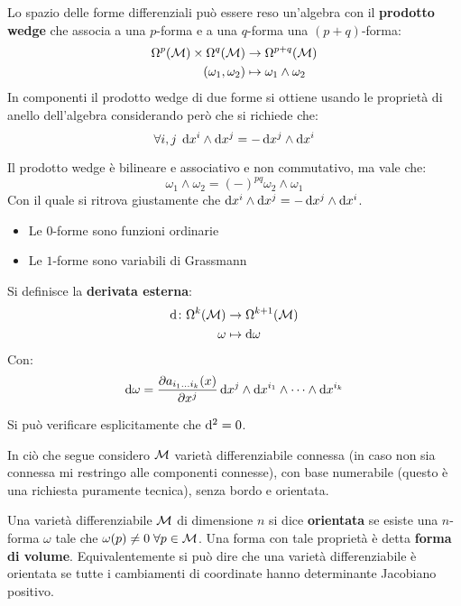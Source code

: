 \begin{definition}
  Lo spazio delle forme differenziali può essere reso un'algebra con il \textbf{prodotto wedge}
  che associa a una $ p $-forma e a una $ q $-forma una $ (p+q) $-forma:
  \begin{align*}
    \Omega^p(\mathcal{M}) \times \Omega^q(\mathcal{M}) & \to \Omega^{p+q}(\mathcal{M}) \\
    (\omega_1, \omega_2) & \mapsto \omega_1 \wedge \omega_2
  \end{align*}
  In componenti il prodotto wedge di due forme si ottiene usando le proprietà di anello dell'algebra
  considerando però che si richiede che:
  \[
    \forall i,j \; \operatorname{d}\!{x}^i \wedge \operatorname{d}\!{x}^j = - \operatorname{d}\!{x}^j \wedge \operatorname{d}\!{x}^i
  \]
\end{definition}
Il prodotto wedge è bilineare e associativo e non commutativo, ma vale che:
\[
  \omega_1 \wedge \omega_2 = (-)^{pq} \omega_2 \wedge \omega_1
\]
Con il quale si ritrova giustamente che $ \operatorname{d}\!{x}^i \wedge \operatorname{d}\!{x}^j = - \operatorname{d}\!{x}^j \wedge \operatorname{d}\!{x}^i $.
\begin{example}\hfill
  \begin{itemize}
  \item Le $ 0 $-forme sono funzioni ordinarie
  \item Le $ 1 $-forme sono variabili di Grassmann
  \end{itemize}
\end{example}
\begin{definition}
  Si definisce la \textbf{derivata esterna}:
  \begin{align*}
    \operatorname{d}\!{} \colon \Omega^k(\mathcal{M}) & \to \Omega^{k+1}(\mathcal{M}) \\
    \omega & \mapsto \operatorname{d}\!{\omega}
  \end{align*}
  Con:
  \[
    \operatorname{d}\!{\omega} = \frac{\partial a_{i_1\dots i_k}(x )}{\partial x^j} \operatorname{d}\!{x}^j \wedge \operatorname{d}\!{x}^{i_1} \wedge \dots \wedge \operatorname{d}\!{x}^{i_k}
  \]
\end{definition}
\begin{osservation}
  Si può verificare esplicitamente che $ \operatorname{d}\!{}^2 = 0 $.
\end{osservation}
In ciò che segue considero $ \mathcal{M} $ varietà differenziabile connessa (in caso non
sia connessa mi restringo alle componenti connesse), con base numerabile
(questo è una richiesta puramente tecnica), senza bordo e orientata.
\begin{definition}
  Una varietà differenziabile $ \mathcal{M} $ di dimensione $ n $ si dice
  \textbf{orientata} se esiste una
  $ n $-forma $ \omega $ tale che $ \omega(p) \not= 0 \; \forall p \in \mathcal{M} $. Una forma con tale proprietà
  è detta \textbf{forma di volume}. Equivalentemente si può
  dire che una varietà differenziabile è orientata se tutte i cambiamenti
  di coordinate hanno determinante Jacobiano positivo.
\end{definition}
